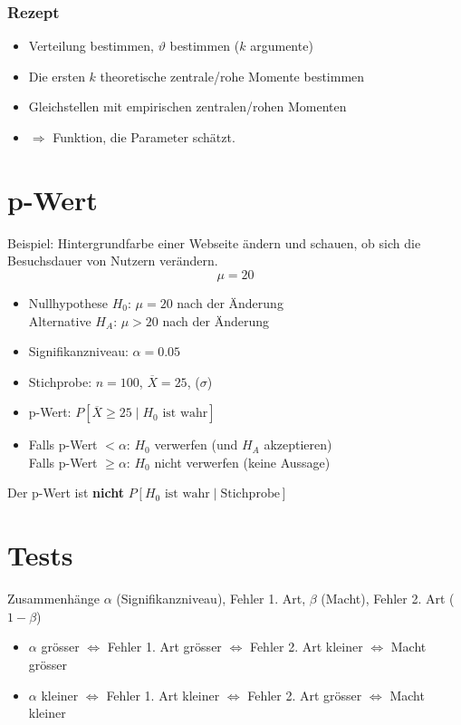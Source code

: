 \subsubsection{Rezept}

\begin{itemize}
	\item Verteilung bestimmen, $\vartheta$ bestimmen ($k$ argumente)
	\item Die ersten $k$ theoretische zentrale/rohe Momente bestimmen
	\item Gleichstellen mit empirischen zentralen/rohen Momenten
	\item $\Rightarrow$ Funktion, die Parameter schätzt.
\end{itemize}

\section{p-Wert}

Beispiel: Hintergrundfarbe einer Webseite ändern und schauen, ob sich die Besuchsdauer von Nutzern verändern. $$\mu = 20$$

\begin{itemize}
	\item Nullhypothese $H_0$: $\mu = 20$ nach der Änderung\\Alternative $H_A$: $\mu > 20$ nach der Änderung
	\item Signifikanzniveau: $\alpha = 0.05$
	\item Stichprobe: $n=100$, $\overline{X} = 25$, ($\sigma$)
	\item p-Wert: $P[\overline{X} \geq 25 \mid H_0 \text{ ist wahr}]$
	\item Falls p-Wert $< \alpha$: $H_0$ verwerfen (und $H_A$ akzeptieren)\\Falls p-Wert $\geq \alpha$: $H_0$ nicht verwerfen (keine Aussage)
\end{itemize}

Der p-Wert ist \textbf{nicht} $P[H_0 \text{ ist wahr} \mid \text{Stichprobe}]$

\section{Tests}

Zusammenhänge $\alpha$ (Signifikanzniveau), Fehler 1. Art, $\beta$ (Macht), Fehler 2. Art ($1-\beta$)

\begin{itemize}
	\item $\alpha$ grösser $\iff$ Fehler 1. Art grösser $\iff$ Fehler 2. Art kleiner $\iff$ Macht grösser
	\item $\alpha$ kleiner $\iff$ Fehler 1. Art kleiner $\iff$ Fehler 2. Art grösser $\iff$ Macht kleiner
\end{itemize}

